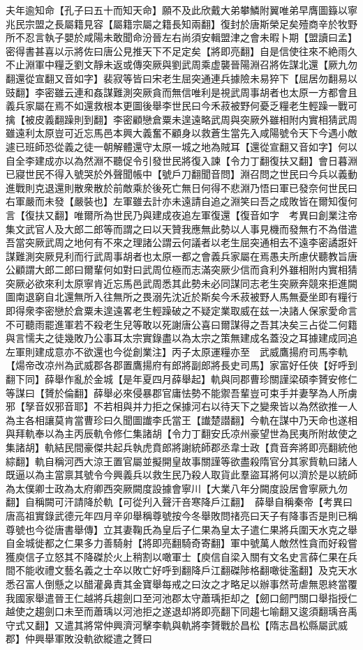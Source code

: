 夫年逾知命【孔子曰五十而知天命】願不及此欣戴大弟攀鱗附翼唯弟早膺圖籙以寧兆民宗盟之長屬籍見容【屬籍宗屬之籍長知兩翻】復封於唐斯榮足矣殪商辛於牧野所不忍言執子嬰於咸陽未敢聞命汾晉左右尚須安輯盟津之會未暇卜期【盟讀曰孟】密得書甚喜以示將佐曰唐公見推天下不足定矣【將即亮翻】自是信使往來不絶雨久不止淵軍中糧乏劉文靜未返或傳突厥與劉武周乘虚襲晉陽淵召將佐謀北還【厥九勿翻還從宣翻又音如字】裴寂等皆曰宋老生屈突通連兵據險未易猝下【屈居勿翻易以豉翻】李密雖云連和姦謀難測突厥貪而無信唯利是視武周事胡者也太原一方都會且義兵家屬在焉不如還救根本更圖後舉李世民曰今禾菽被野何憂乏糧老生輕躁一戰可擒【被皮義翻躁則到翻】李密顧戀倉粟未遑遠略武周與突厥外雖相附内實相猜武周雖遠利太原豈可近忘馬邑本興大義奮不顧身以救蒼生當先入咸陽號令天下今遇小敵遽已班師恐從義之徒一朝解體還守太原一城之地為賊耳【還從宣翻又音如字】何以自全李建成亦以為然淵不聽促令引發世民將復入諫【令力丁翻復扶又翻】會日暮淵已寢世民不得入號哭於外聲聞帳中【號戶刀翻聞音問】淵召問之世民曰今兵以義動進戰則克退還則散衆散於前敵乘於後死亡無日何得不悲淵乃悟曰軍已發奈何世民曰右軍嚴而未發【嚴裝也】左軍雖去計亦未遠請自追之淵笑曰吾之成敗皆在爾知復何言【復扶又翻】唯爾所為世民乃與建成夜追左軍復還【復音如字　考異曰創業注帝集文武官人及大郎二郎等而謂之曰以天贊我應無此勢以人事見機而發無冇不為借遣吾當突厥武周之地何有不來之理諸公謂云何議者以老生屈突通相去不遠李密譎誑奸謀難測突厥見利而行武周事胡者也太原一都之會義兵家屬在焉愚夫所慮伏聽教旨唐公顧謂大郎二郎曰爾輩何如對曰武周位極而志滿突厥少信而貪利外雖相附内實相猜突厥必欲來利太原寧肯近忘馬邑武周悉其此勢未必同謀同志老生突厥奔競來拒進闕圖南退窮自北還無所入往無所之畏溺先沈近於斯矣今禾菽被野人馬無憂坐即有糧行即得衆李密戀於倉粟未遑遠畧老生輕躁破之不疑定業取威在兹一决諸人保家愛命言不可聽雨罷進軍若不殺老生兒等敢以死謝唐公喜曰爾謀得之吾其决矣三占從二何籍與言懦夫之徒幾敗乃公事耳太宗實錄盡以為太宗之策無建成名蓋没之耳據建成同追左軍則建成意亦不欲還也今從創業注】丙子太原運糧亦至　武威鷹揚府司馬李軌【煬帝改凉州為武威郡各郡置鷹揚府有郎將副郎將長史司馬】家富好任俠【好呼到翻下同】薛舉作亂於金城【是年夏四月薛舉起】軌與同郡曹珍關謹梁碩李贇安修仁等謀曰【贇於倫翻】薛舉必來侵暴郡官庸怯勢不能禦吾輩豈可束手并妻孥為人所虜邪【孥音奴邪音耶】不若相與并力拒之保據河右以待天下之變衆皆以為然欲推一人為主各相讓莫肯當曹珍曰久聞圖䜟李氏當王【䜟楚譛翻】今軌在謀中乃天命也遂相與拜軌奉以為主丙辰軌令修仁集諸胡【令力丁翻安氏凉州豪望世為民夷所附故使之集諸胡】軌結民間豪傑共起兵執虎賁郎將謝統師郡丞韋士政【賁音奔將即亮翻統他綜翻】軌自稱河西大涼王置官屬並擬開皇故事關謹等欲盡殺隋官分其家貲軌曰諸人既逼以為主當禀其號令今興義兵以救生民乃殺人取貨此羣盜耳將何以濟於是以統師為太僕卿士政為太府卿西突厥闕度設據會寧川【大業八年分闕度設居會寧厥九勿翻】自稱闕可汗請降於軌【可從刋入聲汗咅寒降戶江翻】　薛舉自稱秦帝【考異曰唐高祖實錄武德元年四月辛卯舉稱尊號按今冬舉敗問禇亮曰天子有降事否是則已稱尊號也今從唐書舉傳】立其妻鞠氏為皇后子仁果為皇太子遣仁果將兵圍天水克之舉自金城徙都之仁果多力善騎射【將即亮翻騎奇寄翻】軍中號萬人敵然性貪而好殺嘗獲庾信子立怒其不降磔於火上稍割以噉軍士【庾信自梁入關有文名史言薛仁果在兵間不能收禮文藝名義之士卒以敗亡好呼到翻降戶江翻磔陟格翻噉徙濫翻】及克天水悉召富人倒懸之以醋灌鼻責其金寶舉每戒之曰汝之才略足以辦事然苛虐無恩終當覆我國家舉遣晉王仁越將兵趨劍口至河池郡太守蕭瑀拒却之【劒口劒門關口舉指授仁越使之趨劍口未至而蕭瑀以河池拒之遂退却將即亮翻下同趨七喻翻又逡須翻瑀咅禹守式又翻】又遣其將常仲興濟河擊李軌與軌將李贇戰於昌松【隋志昌松縣屬武威郡】仲興舉軍敗没軌欲縱遣之贇曰